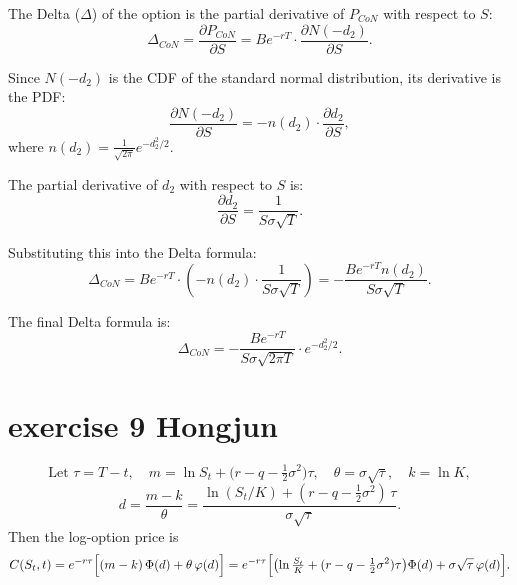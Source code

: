 \documentclass{article}
\begin{document}
The Delta ($\Delta$) of the option is the partial derivative of $P_{CoN}$ with respect to $S$:
\[
\Delta_{CoN} = \frac{\partial P_{CoN}}{\partial S} = B e^{-rT} \cdot \frac{\partial N(-d_2)}{\partial S}.
\]

Since $N(-d_2)$ is the CDF of the standard normal distribution, its derivative is the PDF:
\[
\frac{\partial N(-d_2)}{\partial S} = -n(d_2) \cdot \frac{\partial d_2}{\partial S},
\]
where $n(d_2) = \frac{1}{\sqrt{2\pi}} e^{-d_2^2/2}$.

The partial derivative of $d_2$ with respect to $S$ is:
\[
\frac{\partial d_2}{\partial S} = \frac{1}{S \sigma \sqrt{T}}.
\]

Substituting this into the Delta formula:
\[
\Delta_{CoN} = B e^{-rT} \cdot \left( -n(d_2) \cdot \frac{1}{S \sigma \sqrt{T}} \right) = -\frac{B e^{-rT} n(d_2)}{S \sigma \sqrt{T}}.
\]

The final Delta formula is:
\[
\Delta_{CoN} = -\frac{B e^{-rT}}{S \sigma \sqrt{2\pi T}} \cdot e^{-d_2^2/2}.
\]


\section{exercise 9 Hongjun}
\[
\text{Let }\tau = T - t,\quad m = \ln S_t + \bigl(r - q - \tfrac12\sigma^2\bigr)\tau,\quad
\theta = \sigma\sqrt{\tau},\quad k = \ln K,
\]
\[
d = \frac{m - k}{\theta}
= \frac{\ln(S_t/K) + (r - q - \tfrac12\sigma^2)\,\tau}{\sigma\sqrt{\tau}}.
\]
Then the log‐option price is
\[
C(S_t,t)
= e^{-r\tau}\Bigl[(m-k)\,\Phi(d) + \theta\,\varphi(d)\Bigr]
= e^{-r\tau}\Bigl[\bigl(\ln\tfrac{S_t}{K}+(r-q-\tfrac12\sigma^2)\tau\bigr)\Phi(d)
+\sigma\sqrt{\tau}\,\varphi(d)\Bigr].
\]
\end{document}
